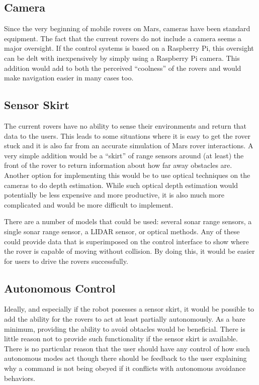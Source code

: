 \documentclass[letterpaper,10pt]{article}
\begin{document}
  \subsection{Camera}
    Since the very beginning of mobile rovers on Mars, cameras have been standard equipment.  The fact that the current rovers do not include a camera seems a major oversight.  If the control systems is based on a Raspberry Pi, this oversight can be delt with inexpensively by simply using a Raspberry Pi camera.  This addition would add to both the perceived ``coolness'' of the rovers and would make navigation easier in many cases too.
  
  \subsection{Sensor Skirt}
    The current rovers have no ability to sense their environments and return that data to the users.  This leads to some situations where it is easy to get the rover stuck and it is also far from an accurate simulation of Mars rover interactions.  A very simple addition would be a ``skirt'' of range sensors around (at least) the front of the rover to return information about how far away obstacles are.  Another option for implementing this would be to use optical techniques on the cameras to do depth estimation.  While such optical depth estimation would potentially be less expensive and more productive, it is also much more complicated and would be more difficult to implement.
    
    There are a number of models that could be used: several sonar range sensors, a single sonar range sensor, a LIDAR sensor, or optical methods.  Any of these could provide data that is superimposed on the control interface to show where the rover is capable of moving without collision.  By doing this, it would be easier for users to drive the rovers successfully.
    
  \subsection{Autonomous Control}
    Ideally, and especially if the robot posesses a sensor skirt, it would be possible to add the ability for the rovers to act at least partially autonomously.  As a bare minimum, providing the ability to avoid obtacles would be beneficial.  There is little reason not to provide such functionality if the sensor skirt is available.  There is no particular reason that the user should have any control of how such autonomous modes act though there should be feedback to the user explaining why a command is not being obeyed if it conflicts with autonomous avoidance behaviors.
    
\end{document}

